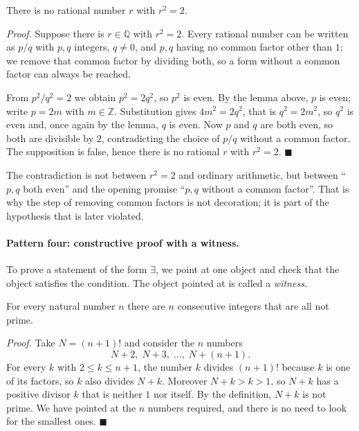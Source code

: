 \begin{teorema}
There is no rational number $r$ with $r^{2} = 2$.
\end{teorema}
\par\smallskip\noindent\textit{Proof.} Suppose there is $r \in \mathbb{Q}$ with
$r^{2} = 2$. Every rational number can be written as $p/q$ with $p,q$ integers,
$q \neq 0$, and $p,q$ having no common factor other than $1$; we
remove that common factor by dividing both, so a form without a common
factor can always be reached.

From $p^{2}/q^{2} = 2$ we obtain $p^{2} = 2q^{2}$, so $p^{2}$ is even. By
the lemma above, $p$ is even; write $p = 2m$ with $m \in \mathbb{Z}$. Substitution gives
$4m^{2} = 2q^{2}$, that is $q^{2} = 2m^{2}$, so $q^{2}$ is even and, once again
by the lemma, $q$ is even. Now $p$ and $q$ are both even, so both are divisible by
$2$, contradicting the choice of $p/q$ without a common factor. The supposition is false,
hence there is no rational $r$ with $r^{2} = 2$.
\hfill$\blacksquare${\parfillskip=0pt\par}

The contradiction is not between $r^{2}=2$ and ordinary arithmetic, but between ``$p,q$
both even'' and the opening promise ``$p,q$ without a common factor''. That is why the step
of removing common factors is not decoration; it is part of the hypothesis that is later violated.

\paragraph{Pattern four: constructive proof with a witness.} To prove a statement
of the form $\exists$, we point at one object and check that the object satisfies
the condition. The object pointed at is called a \emph{witness}.

\begin{teorema}
For every natural number $n$ there are $n$ consecutive integers that are all
not prime.
\end{teorema}
\par\smallskip\noindent\textit{Proof.} Take $N = (n+1)!$ and consider the $n$ numbers
\[
  N+2,\; N+3,\; \dots,\; N+(n+1).
\]
For every $k$ with $2 \leq k \leq n+1$, the number $k$ divides $(n+1)!$ because $k$
is one of its factors, so $k$ also divides $N+k$. Moreover
$N+k > k > 1$, so $N+k$ has a positive divisor $k$ that is neither $1$ nor
itself. By the definition, $N+k$ is not prime. We have pointed at the $n$ numbers
required, and there is no need to look for the smallest ones.
\hfill$\blacksquare${\parfillskip=0pt\par}


